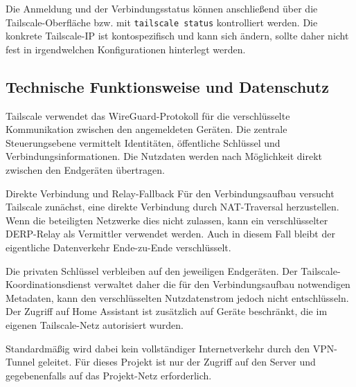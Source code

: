 
Die Anmeldung und der Verbindungsstatus können anschließend über die Tailscale-Oberfläche bzw. mit \texttt{tailscale status} kontrolliert werden. Die konkrete Tailscale-IP ist kontospezifisch und kann sich ändern, sollte daher nicht fest in irgendwelchen Konfigurationen hinterlegt werden.


\subsection{Technische Funktionsweise und Datenschutz}

Tailscale verwendet das WireGuard-Protokoll für die verschlüsselte Kommunikation zwischen den angemeldeten Geräten. Die zentrale Steuerungsebene vermittelt Identitäten, öffentliche Schlüssel und Verbindungsinformationen. Die Nutzdaten werden nach Möglichkeit direkt zwischen den Endgeräten übertragen. 

\begin{InfoBox}{Direkte Verbindung und Relay-Fallback}
    \scriptsize Für den Verbindungsaufbau versucht Tailscale zunächst, eine direkte Verbindung durch NAT-Traversal herzustellen. Wenn die beteiligten Netzwerke dies nicht zulassen, kann ein verschlüsselter DERP-Relay als Vermittler verwendet werden. Auch in diesem Fall bleibt der eigentliche Datenverkehr Ende-zu-Ende verschlüsselt.
\end{InfoBox}

Die privaten Schlüssel verbleiben auf den jeweiligen Endgeräten. Der Tailscale-Koordinationsdienst verwaltet daher die für den Verbindungsaufbau notwendigen Metadaten, kann den verschlüsselten Nutzdatenstrom jedoch nicht entschlüsseln. Der Zugriff auf Home Assistant ist zusätzlich auf Geräte beschränkt, die im eigenen Tailscale-Netz autorisiert wurden.

Standardmäßig wird dabei kein vollständiger Internetverkehr durch den VPN-Tunnel geleitet. Für dieses Projekt ist nur der Zugriff auf den Server und gegebenenfalls auf das Projekt-Netz erforderlich.
